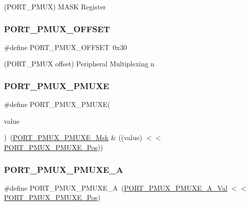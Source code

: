 (P\+O\+R\+T\+\_\+\+P\+M\+UX) M\+A\+SK Register 

\mbox{\label{group___s_a_m_d21___p_o_r_t_ga2b2cfb87664f62a60eb5f01a7fbf4e9a}} 
\subsubsection{\texorpdfstring{PORT\_PMUX\_OFFSET}{PORT\_PMUX\_OFFSET}}
{\footnotesize\ttfamily \#define P\+O\+R\+T\+\_\+\+P\+M\+U\+X\+\_\+\+O\+F\+F\+S\+ET~0x30}



(P\+O\+R\+T\+\_\+\+P\+M\+UX offset) Peripheral Multiplexing n 

\mbox{\label{group___s_a_m_d21___p_o_r_t_ga1a0548ef99b601e76ee01c5de4b8f32b}} 
\subsubsection{\texorpdfstring{PORT\_PMUX\_PMUXE}{PORT\_PMUX\_PMUXE}}
{\footnotesize\ttfamily \#define P\+O\+R\+T\+\_\+\+P\+M\+U\+X\+\_\+\+P\+M\+U\+XE(\begin{DoxyParamCaption}\item[{}]{value }\end{DoxyParamCaption})~(\mbox{\hyperlink{group___s_a_m_d21___p_o_r_t_gae955cb77e730b16d702cd0fcdb156ec4}{P\+O\+R\+T\+\_\+\+P\+M\+U\+X\+\_\+\+P\+M\+U\+X\+E\+\_\+\+Msk}} \& ((value) $<$$<$ \mbox{\hyperlink{group___s_a_m_d21___p_o_r_t_ga38a4c4871ecabeb4ad36398b73685bac}{P\+O\+R\+T\+\_\+\+P\+M\+U\+X\+\_\+\+P\+M\+U\+X\+E\+\_\+\+Pos}}))}

\mbox{\label{group___s_a_m_d21___p_o_r_t_ga9b4f9a2d8bac840309923085990a59aa}} 
\subsubsection{\texorpdfstring{PORT\_PMUX\_PMUXE\_A}{PORT\_PMUX\_PMUXE\_A}}
{\footnotesize\ttfamily \#define P\+O\+R\+T\+\_\+\+P\+M\+U\+X\+\_\+\+P\+M\+U\+X\+E\+\_\+A~(\mbox{\hyperlink{group___s_a_m_d21___p_o_r_t_gac2904834a0243c812025b5da13235658}{P\+O\+R\+T\+\_\+\+P\+M\+U\+X\+\_\+\+P\+M\+U\+X\+E\+\_\+\+A\+\_\+\+Val}}         $<$$<$ \mbox{\hyperlink{group___s_a_m_d21___p_o_r_t_ga38a4c4871ecabeb4ad36398b73685bac}{P\+O\+R\+T\+\_\+\+P\+M\+U\+X\+\_\+\+P\+M\+U\+X\+E\+\_\+\+Pos}})}

